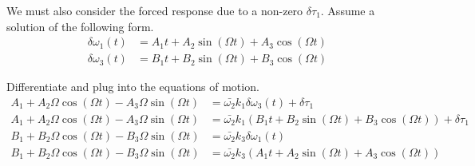 \documentclass[]{article}
\begin{document}
We must also consider the forced response due to a non-zero $\delta \tau_1$. Assume a solution of the following form.
\begin{align}
	\delta \omega_1 (t) & = A_1 t + A_2 \sin(\Omega t) + A_3 \cos(\Omega t) \\
	\delta \omega_3 (t) & = B_1 t + B_2 \sin(\Omega t) + B_3 \cos(\Omega t)
\end{align}

Differentiate and plug into the equations of motion.
\begin{align}
A_1 + A_2 \Omega \cos(\Omega t) - A_3 \Omega \sin (\Omega t) & = \bar{\omega_2} k_1 \delta \omega_3(t) + \delta \tau_1 \\
A_1 + A_2 \Omega \cos(\Omega t) - A_3 \Omega \sin (\Omega t) & = \bar{\omega_2} k_1 \left( B_1 t + B_2 \sin(\Omega t) + B_3 \cos(\Omega t) \right) + \delta \tau_1 \\
B_1 + B_2 \Omega \cos(\Omega t) - B_3 \Omega \sin (\Omega t) & = \bar{\omega_2} k_3 \delta \omega_1(t) \\
B_1 + B_2 \Omega \cos(\Omega t) - B_3 \Omega \sin (\Omega t) & = \bar{\omega_2} k_3 \left( A_1 t + A_2 \sin(\Omega t) + A_3 \cos(\Omega t) \right)
\end{align}
\end{document}
